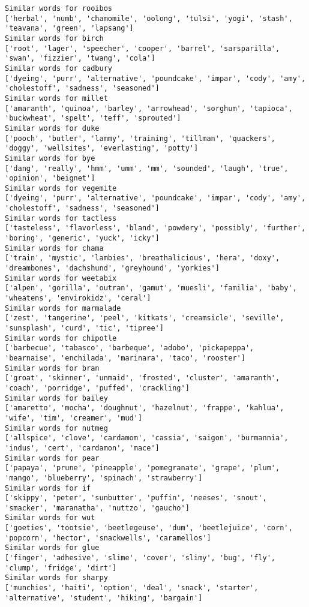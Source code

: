 \documentclass[11pt]{article}
\begin{document}
\begin{Verbatim}[commandchars=\\\{\}]
Similar words for rooibos
['herbal', 'numb', 'chamomile', 'oolong', 'tulsi', 'yogi', 'stash', 'teavana', 'green', 'lapsang']
Similar words for birch
['root', 'lager', 'speecher', 'cooper', 'barrel', 'sarsparilla', 'swan', 'fizzier', 'twang', 'cola']
Similar words for cadbury
['dyeing', 'purr', 'alternative', 'poundcake', 'impar', 'cody', 'amy', 'cholestoff', 'sadness', 'seasoned']
Similar words for millet
['amaranth', 'quinoa', 'barley', 'arrowhead', 'sorghum', 'tapioca', 'buckwheat', 'spelt', 'teff', 'sprouted']
Similar words for duke
['pooch', 'butler', 'lammy', 'training', 'tillman', 'quackers', 'doggy', 'wellsites', 'everlasting', 'potty']
Similar words for bye
['dang', 'really', 'hmm', 'umm', 'mm', 'sounded', 'laugh', 'true', 'opinion', 'beignet']
Similar words for vegemite
['dyeing', 'purr', 'alternative', 'poundcake', 'impar', 'cody', 'amy', 'cholestoff', 'sadness', 'seasoned']
Similar words for tactless
['tasteless', 'flavorless', 'bland', 'powdery', 'possibly', 'further', 'boring', 'generic', 'yuck', 'icky']
Similar words for chama
['train', 'mystic', 'lambies', 'breathalicious', 'hera', 'doxy', 'dreambones', 'dachshund', 'greyhound', 'yorkies']
Similar words for weetabix
['alpen', 'gorilla', 'outran', 'gamut', 'muesli', 'familia', 'baby', 'wheatens', 'envirokidz', 'ceral']
Similar words for marmalade
['zest', 'tangerine', 'peel', 'kitkats', 'creamsicle', 'seville', 'sunsplash', 'curd', 'tic', 'tipree']
Similar words for chipotle
['barbecue', 'tabasco', 'barbeque', 'adobo', 'pickapeppa', 'bearnaise', 'enchilada', 'marinara', 'taco', 'rooster']
Similar words for bran
['groat', 'skinner', 'unmaid', 'frosted', 'cluster', 'amaranth', 'coach', 'porridge', 'puffed', 'crackling']
Similar words for bailey
['amaretto', 'mocha', 'doughnut', 'hazelnut', 'frappe', 'kahlua', 'wife', 'tim', 'creamer', 'mud']
Similar words for nutmeg
['allspice', 'clove', 'cardamom', 'cassia', 'saigon', 'burmannia', 'indus', 'cert', 'cardamon', 'mace']
Similar words for pear
['papaya', 'prune', 'pineapple', 'pomegranate', 'grape', 'plum', 'mango', 'blueberry', 'spinach', 'strawberry']
Similar words for if
['skippy', 'peter', 'sunbutter', 'puffin', 'neeses', 'snout', 'smacker', 'maranatha', 'nuttzo', 'gaucho']
Similar words for wut
['goeties', 'tootsie', 'beetlegeuse', 'dum', 'beetlejuice', 'corn', 'popcorn', 'hector', 'snackwells', 'caramellos']
Similar words for glue
['finger', 'adhesive', 'slime', 'cover', 'slimy', 'bug', 'fly', 'clump', 'fridge', 'dirt']
Similar words for sharpy
['munchies', 'haiti', 'option', 'deal', 'snack', 'starter', 'alternative', 'student', 'hiking', 'bargain']

\end{Verbatim}
\end{document}
